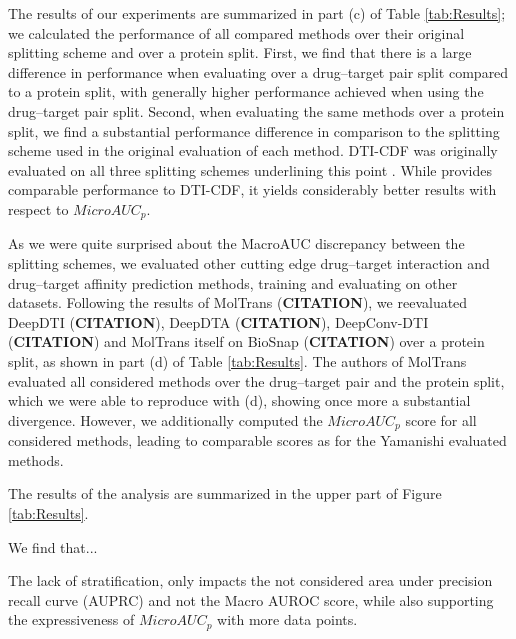 \documentclass{bioinfo}
\renewcommand{\cite}{\citep}
\begin{document}
The results of our experiments are summarized in part (c) of Table
\ref{tab:Results}; we calculated the performance of all compared
methods over their original splitting scheme and over a protein
split. First, we find that there is a large difference in performance
when evaluating over a drug--target pair split compared to a
protein split, with generally higher performance achieved when using
the drug--target pair split.
Second, when evaluating the same methods over a protein split, we find
a substantial performance difference in comparison to the splitting
scheme used in the original evaluation of each method. DTI-CDF was
originally evaluated on all three splitting schemes underlining this
point \cite{}. While \name provides comparable performance to DTI-CDF,
it yields considerably better results with respect to $MicroAUC_p$.

As we were quite surprised about the MacroAUC discrepancy between the splitting schemes, we evaluated other cutting edge drug--target interaction and drug--target affinity prediction methods, training and evaluating on other datasets. Following the results of MolTrans (\textbf{CITATION}), we reevaluated DeepDTI (\textbf{CITATION}), DeepDTA (\textbf{CITATION}), DeepConv-DTI (\textbf{CITATION}) and MolTrans itself on BioSnap (\textbf{CITATION}) over a protein split, as shown in part (d) of Table \ref{tab:Results}. The authors of MolTrans evaluated all considered methods over the drug--target pair and the protein split, which we were able to reproduce with (d), showing once more a substantial divergence. However, we additionally computed the $MicroAUC_p$ score for all considered methods, leading to comparable scores as for the Yamanishi evaluated methods. 

The results of the analysis are summarized in the upper part of Figure
\ref{tab:Results}.

We find that...



The lack of stratification, only impacts the not
considered area under precision recall curve (AUPRC) and not the Macro
AUROC score, while also supporting the expressiveness of $MicroAUC_p$
with more data points.

\end{document}
